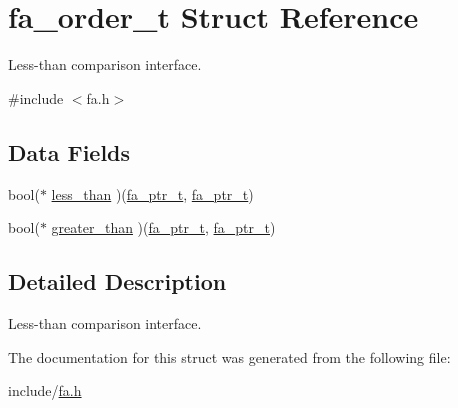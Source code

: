 \hypertarget{structfa__order__t}{\section{fa\-\_\-order\-\_\-t Struct Reference}
\label{structfa__order__t}
}


Less-\/than comparison interface.  




{\ttfamily \#include $<$fa.\-h$>$}

\subsection*{Data Fields}
\begin{DoxyCompactItemize}
\item 
bool($\ast$ \hyperlink{structfa__order__t_ab0ef7ede8e00aee61a76792209e88c0e}{less\-\_\-than} )(\hyperlink{group___fa_ga915ddeae99ad7568b273d2b876425197}{fa\-\_\-ptr\-\_\-t}, \hyperlink{group___fa_ga915ddeae99ad7568b273d2b876425197}{fa\-\_\-ptr\-\_\-t})
\item 
bool($\ast$ \hyperlink{structfa__order__t_a781b0c31ebbd03dad3880f505d27b998}{greater\-\_\-than} )(\hyperlink{group___fa_ga915ddeae99ad7568b273d2b876425197}{fa\-\_\-ptr\-\_\-t}, \hyperlink{group___fa_ga915ddeae99ad7568b273d2b876425197}{fa\-\_\-ptr\-\_\-t})
\end{DoxyCompactItemize}


\subsection{Detailed Description}
Less-\/than comparison interface. 

The documentation for this struct was generated from the following file\-:\begin{DoxyCompactItemize}
\item 
include/\hyperlink{fa_8h}{fa.\-h}\end{DoxyCompactItemize}
